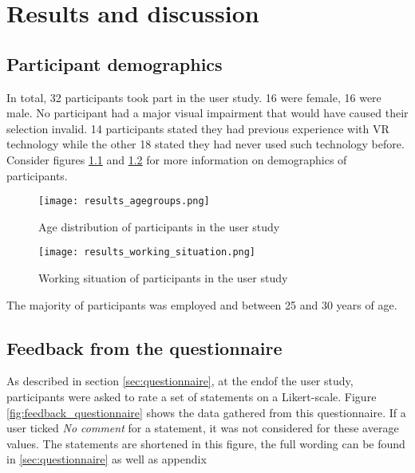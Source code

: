 \chapter{Results and discussion}
\label{sec:results_and_discussion}

	\section{Participant demographics}
	\label{sec:participant_demographics}

In total, 32 participants took part in the user study. 16 were female, 16 were male. No participant had a major visual impairment that would have caused their selection invalid. 14 participants stated they had previous experience with VR technology while the other 18 stated they had never used such technology before. Consider figures \ref{fig:results_agegroups} and \ref{fig:results_working_situation} for more information on demographics of participants.

\begin{figure}[htb]
	\centering
	\texttt{[image: results\_agegroups.png]}\\ %
	\caption{Age distribution of participants in the user study}
	\label{fig:results_agegroups}
\end{figure}

\begin{figure}[htb]
	\centering
	\texttt{[image: results\_working\_situation.png]}\\ %
	\caption{Working situation of participants in the user study}
	\label{fig:results_working_situation}
\end{figure}

The majority of participants was employed and between 25 and 30 years of age.

	\section{Feedback from the questionnaire}
	\label{sec:results_feedback_from_questionnaire}

As described in section \ref{sec:questionnaire}, at the endof the user study, participants were asked to rate a set of statements on a Likert-scale. Figure \ref{fig:feedback_questionnaire} shows the data gathered from this questionnaire. If a user ticked \textit{No comment} for a statement, it was not considered for these average values. The statements are shortened in this figure, the full wording can be found in \ref{sec:questionnaire} as well as appendix 

